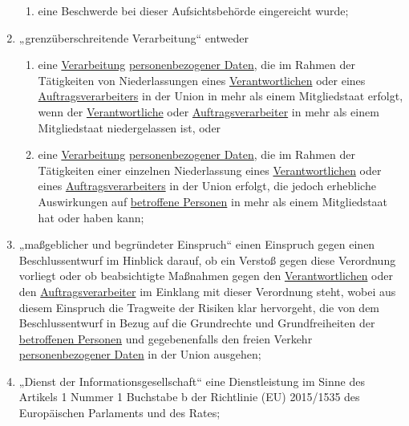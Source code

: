 \begin{enumerate}
\begin{enumerate}
    \item eine Beschwerde bei dieser Aufsichtsbehörde eingereicht wurde;%
  \label{itm:04-22c}

  \end{enumerate}

  \item „grenzüberschreitende Verarbeitung“ entweder%
  \label{itm:04-23}

  \begin{enumerate}

    \item eine \hyperref[itm:04-2]{Verarbeitung} \hyperref[itm:04-1]{personenbezogener Daten}, die im Rahmen der
     Tätigkeiten von Niederlassungen eines
     \hyperref[itm:04-7]{Verantwortlichen} oder eines \hyperref[itm:04-8]{Auftragsverarbeiters} in der Union in mehr als
      einem Mitgliedstaat erfolgt, wenn der
     \hyperref[itm:04-7]{Verantwortliche} oder \hyperref[itm:04-8]{Auftragsverarbeiter} in mehr als einem Mitgliedstaat
      niedergelassen ist, oder%
    \label{itm:04-23a}

    \item eine \hyperref[itm:04-2]{Verarbeitung} \hyperref[itm:04-1]{personenbezogener Daten}, die im Rahmen der
     Tätigkeiten einer einzelnen Niederlassung eines
     \hyperref[itm:04-7]{Verantwortlichen} oder eines \hyperref[itm:04-8]{Auftragsverarbeiters} in der Union erfolgt,
      die jedoch erhebliche Auswirkungen auf
     \hyperref[itm:04-1]{betroffene Personen} in mehr als einem Mitgliedstaat hat oder haben kann;%
    \label{itm:04-23b}

  \end{enumerate}

  \item „maßgeblicher und begründeter Einspruch“ einen Einspruch gegen einen Beschlussentwurf im Hinblick darauf, ob ein
   Verstoß gegen diese Verordnung vorliegt oder ob beabsichtigte Maßnahmen gegen den \hyperref[itm:04-7]
   {Verantwortlichen} oder den
   \hyperref[itm:04-8]{Auftragsverarbeiter} im Einklang mit dieser Verordnung steht, wobei aus diesem Einspruch die
    Tragweite der Risiken klar hervorgeht, die von dem Beschlussentwurf in Bezug auf die Grundrechte und
    Grundfreiheiten der \hyperref[itm:04-1]{betroffenen Personen} und gegebenenfalls den freien Verkehr \hyperref
    [itm:04-1]{personenbezogener Daten} in der Union ausgehen;%
  \label{itm:04-24}

  \item „Dienst der Informationsgesellschaft“ eine Dienstleistung im Sinne des Artikels 1 Nummer 1 Buchstabe b der
   Richtlinie (EU) 2015/1535 des Europäischen Parlaments
   und des Rates;%
  \label{itm:04-25}


\end{enumerate}
